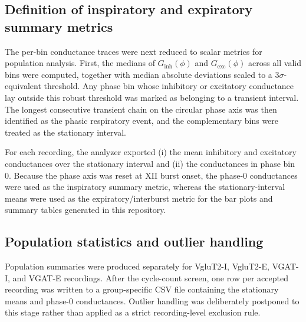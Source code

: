 \documentclass[11pt]{article}
\begin{document}
\subsection{Definition of inspiratory and expiratory summary metrics}
The per-bin conductance traces were next reduced to scalar metrics for population analysis. First, the medians of $G_{\mathrm{inh}}(\phi)$ and $G_{\mathrm{exc}}(\phi)$ across all valid bins were computed, together with median absolute deviations scaled to a 3$\sigma$-equivalent threshold. Any phase bin whose inhibitory or excitatory conductance lay outside this robust threshold was marked as belonging to a transient interval. The longest consecutive transient chain on the circular phase axis was then identified as the phasic respiratory event, and the complementary bins were treated as the stationary interval.

For each recording, the analyzer exported (i) the mean inhibitory and excitatory conductances over the stationary interval and (ii) the conductances in phase bin 0. Because the phase axis was reset at XII burst onset, the phase-0 conductances were used as the inspiratory summary metric, whereas the stationary-interval means were used as the expiratory/interburst metric for the bar plots and summary tables generated in this repository.

\subsection{Population statistics and outlier handling}
Population summaries were produced separately for VgluT2-I, VgluT2-E, VGAT-I, and VGAT-E recordings. After the cycle-count screen, one row per accepted recording was written to a group-specific CSV file containing the stationary means and phase-0 conductances. Outlier handling was deliberately postponed to this stage rather than applied as a strict recording-level exclusion rule.
\end{document}
